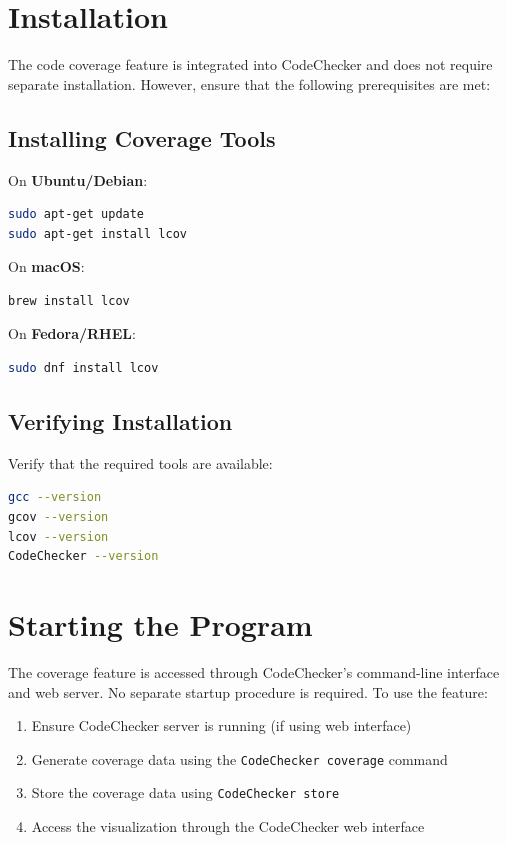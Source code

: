 \section{Installation}

The code coverage feature is integrated into CodeChecker and does not require separate installation. However, ensure that the following prerequisites are met:

\subsection{Installing Coverage Tools}

On \textbf{Ubuntu/Debian}:
\begin{lstlisting}[language=bash, caption={Installing lcov on Ubuntu/Debian}]
sudo apt-get update
sudo apt-get install lcov
\end{lstlisting}

On \textbf{macOS}:
\begin{lstlisting}[language=bash, caption={Installing lcov on macOS}]
brew install lcov
\end{lstlisting}

On \textbf{Fedora/RHEL}:
\begin{lstlisting}[language=bash, caption={Installing lcov on Fedora/RHEL}]
sudo dnf install lcov
\end{lstlisting}

\subsection{Verifying Installation}

Verify that the required tools are available:
\begin{lstlisting}[language=bash, caption={Verifying coverage tools installation}]
gcc --version
gcov --version
lcov --version
CodeChecker --version
\end{lstlisting}

\section{Starting the Program}

The coverage feature is accessed through CodeChecker's command-line interface and web server. No separate startup procedure is required. To use the feature:

\begin{enumerate}
    \item Ensure CodeChecker server is running (if using web interface)
    \item Generate coverage data using the \texttt{CodeChecker coverage} command
    \item Store the coverage data using \texttt{CodeChecker store}
    \item Access the visualization through the CodeChecker web interface
\end{enumerate}

